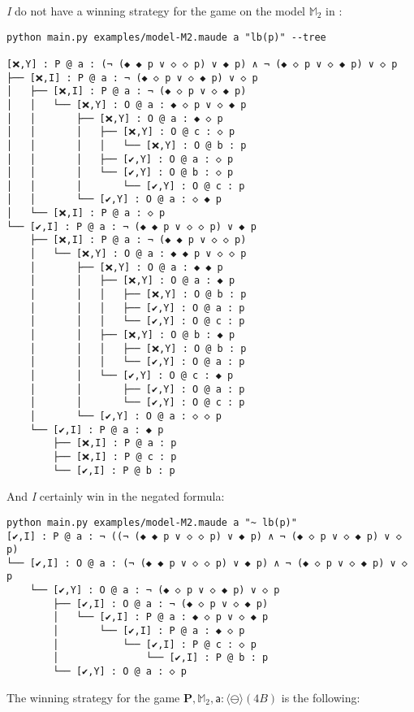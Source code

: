 \documentclass{easychair}
\newcommand{\I}{\emph{I}\xspace}
\newcommand{\M}{\mathbb{M}}
\newcommand{\ag}{\mathsf{a}}
\newcommand{\pnlON}{\langle\ominus\rangle}
\newcommand{\bbM}{\mathbb{M}}
\newcommand{\bfP}{\mathbf{P}}
\begin{document}
\I do not have a winning strategy for the game on the model 
$\M_2$ in : 
\begin{Verbatim}[fontsize=\scriptsize]
python main.py examples/model-M2.maude a "lb(p)" --tree

[❌,Y] : P @ a : (¬ (◆ ◆ p ∨ ◇ ◇ p) ∨ ◆ p) ∧ ¬ (◆ ◇ p ∨ ◇ ◆ p) ∨ ◇ p
├── [❌,I] : P @ a : ¬ (◆ ◇ p ∨ ◇ ◆ p) ∨ ◇ p
│   ├── [❌,I] : P @ a : ¬ (◆ ◇ p ∨ ◇ ◆ p)
│   │   └── [❌,Y] : O @ a : ◆ ◇ p ∨ ◇ ◆ p
│   │       ├── [❌,Y] : O @ a : ◆ ◇ p
│   │       │   ├── [❌,Y] : O @ c : ◇ p
│   │       │   │   └── [❌,Y] : O @ b : p
│   │       │   ├── [✔,Y] : O @ a : ◇ p
│   │       │   └── [✔,Y] : O @ b : ◇ p
│   │       │       └── [✔,Y] : O @ c : p
│   │       └── [✔,Y] : O @ a : ◇ ◆ p
│   └── [❌,I] : P @ a : ◇ p
└── [✔,I] : P @ a : ¬ (◆ ◆ p ∨ ◇ ◇ p) ∨ ◆ p
    ├── [❌,I] : P @ a : ¬ (◆ ◆ p ∨ ◇ ◇ p)
    │   └── [❌,Y] : O @ a : ◆ ◆ p ∨ ◇ ◇ p
    │       ├── [❌,Y] : O @ a : ◆ ◆ p
    │       │   ├── [❌,Y] : O @ a : ◆ p
    │       │   │   ├── [❌,Y] : O @ b : p
    │       │   │   ├── [✔,Y] : O @ a : p
    │       │   │   └── [✔,Y] : O @ c : p
    │       │   ├── [❌,Y] : O @ b : ◆ p
    │       │   │   ├── [❌,Y] : O @ b : p
    │       │   │   └── [✔,Y] : O @ a : p
    │       │   └── [✔,Y] : O @ c : ◆ p
    │       │       ├── [✔,Y] : O @ a : p
    │       │       └── [✔,Y] : O @ c : p
    │       └── [✔,Y] : O @ a : ◇ ◇ p
    └── [✔,I] : P @ a : ◆ p
        ├── [❌,I] : P @ a : p
        ├── [❌,I] : P @ c : p
        └── [✔,I] : P @ b : p
\end{Verbatim}

And \I certainly win in the negated formula: 

\begin{Verbatim}[fontsize=\scriptsize]
python main.py examples/model-M2.maude a "~ lb(p)"
[✔,I] : P @ a : ¬ ((¬ (◆ ◆ p ∨ ◇ ◇ p) ∨ ◆ p) ∧ ¬ (◆ ◇ p ∨ ◇ ◆ p) ∨ ◇ p)
└── [✔,I] : O @ a : (¬ (◆ ◆ p ∨ ◇ ◇ p) ∨ ◆ p) ∧ ¬ (◆ ◇ p ∨ ◇ ◆ p) ∨ ◇ p
    └── [✔,Y] : O @ a : ¬ (◆ ◇ p ∨ ◇ ◆ p) ∨ ◇ p
        ├── [✔,I] : O @ a : ¬ (◆ ◇ p ∨ ◇ ◆ p)
        │   └── [✔,I] : P @ a : ◆ ◇ p ∨ ◇ ◆ p
        │       └── [✔,I] : P @ a : ◆ ◇ p
        │           └── [✔,I] : P @ c : ◇ p
        │               └── [✔,I] : P @ b : p
        └── [✔,Y] : O @ a : ◇ p
\end{Verbatim}

The winning strategy for the game 
$\bfP,\bbM_2,\ag : \pnlON (4B)$
is the following: 
\end{document}
